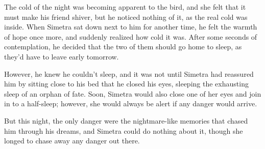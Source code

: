 The cold of the night was becoming apparent to the bird, and she felt that it must make his friend shiver, but he noticed nothing of it, as the real cold was inside. When Simetra sat down next to him for another time, he felt the warmth of hope once more, and suddenly realized how cold it was. After some seconds of contemplation, he decided that the two of them should go home to sleep, as they'd have to leave early tomorrow.

However, he knew he couldn't sleep, and it was not until Simetra had reassured him by sitting close to his bed that he closed his eyes, sleeping the exhausting sleep of an orphan of fate.
Soon, Simetra would also close one of her eyes and join in to a half-sleep; however, she would always be alert if any danger would arrive.

But this night, the only danger were the nightmare-like memories that chased him through his dreams, and Simetra could do nothing about it, though she longed to chase away any danger out there.

